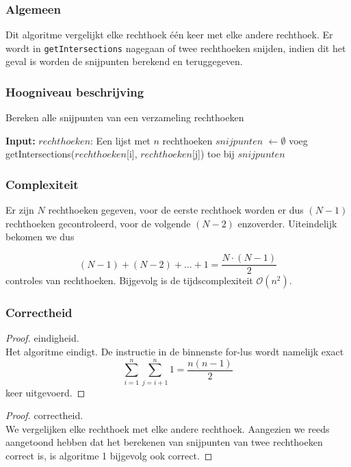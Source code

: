 \documentclass{article}
\begin{document}
\subsubsection{Algemeen}
Dit algoritme vergelijkt elke rechthoek \'e\'en keer met elke andere rechthoek. Er wordt in \texttt{getIntersections} nagegaan of twee rechthoeken snijden, indien dit het geval is worden de snijpunten berekend en teruggegeven.

\subsubsection{Hoogniveau beschrijving}
\label{algo1_2}
\begin{algorithm}
\caption{Bereken alle snijpunten van een verzameling rechthoeken}
\begin{algorithmic}
	\STATE \textbf{Input:}  $rechthoeken$: Een lijst met $n$ rechthoeken
	\STATE $snijpunten$ $\gets \emptyset$
            \STATE  voeg getIntersections($rechthoeken$[i], $rechthoeken$[j]) toe bij $snijpunten$
        \ENDFOR
    \ENDFOR
\end{algorithmic}
\end{algorithm}

\subsubsection{Complexiteit}
\label{algo1_3}
Er zijn $N$ rechthoeken gegeven, voor de eerste rechthoek worden er dus $(N-1)$ rechthoeken gecontroleerd, voor de volgende $(N-2)$ enzoverder. Uiteindelijk bekomen we dus

\[ (N-1) + (N-2) + \dots + 1 = \frac{N \cdot (N-1)}{2}\]
controles van rechthoeken. Bijgevolg is de tijdscomplexiteit $\mathcal{O}(n^2)$.


\subsubsection{Correctheid}
\begin{proof} eindigheid.\\
Het algoritme eindigt. De instructie in de binnenste for-lus
wordt namelijk exact \[\sum_{i=1}^{n} \sum_{j=i+1}^{n} 1 = \frac{n(n-1)}{2} \]
keer uitgevoerd.
\end{proof}

\begin{proof} correctheid.\\
We vergelijken elke rechthoek met elke andere rechthoek. Aangezien we reeds aangetoond hebben dat het berekenen van snijpunten van twee rechthoeken correct is, is algoritme 1 bijgevolg ook correct.
\end{proof}
\end{document}
